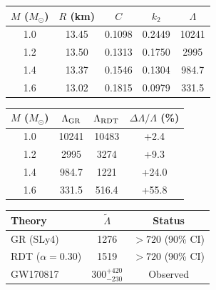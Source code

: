 
\begin{table}
\begin{tabular}{ccccc}
\hline\hline
$M$ ($M_\odot$) & $R$ (km) & $C$ & $k_2$ & $\Lambda$ \\
\hline
1.0 & 13.45 & 0.1098 & 0.2449 & 10241 \\
1.2 & 13.50 & 0.1313 & 0.1750 & 2995 \\
1.4 & 13.37 & 0.1546 & 0.1304 & 984.7 \\
1.6 & 13.02 & 0.1815 & 0.0979 & 331.5 \\
\hline\hline
\end{tabular}
\end{table}

\begin{table}
\begin{tabular}{cccc}
\hline\hline
$M$ ($M_\odot$) & $\Lambda_{\rm GR}$ & $\Lambda_{\rm RDT}$ & $\Delta\Lambda/\Lambda$ (\%) \\
\hline
1.0 & 10241 & 10483 & +2.4 \\
1.2 & 2995 & 3274 & +9.3 \\
1.4 & 984.7 & 1221 & +24.0 \\
1.6 & 331.5 & 516.4 & +55.8 \\
\hline\hline
\end{tabular}
\end{table}

\begin{table}
\begin{tabular}{lcc}
\hline\hline
Theory & $\tilde{\Lambda}$ & Status \\
\hline
GR (SLy4) & 1276 & $> 720$ (90\% CI) \\
RDT ($\alpha=0.30$) & 1519 & $> 720$ (90\% CI) \\
GW170817 & $300^{+420}_{-230}$ & Observed \\
\hline\hline
\end{tabular}
\end{table}
